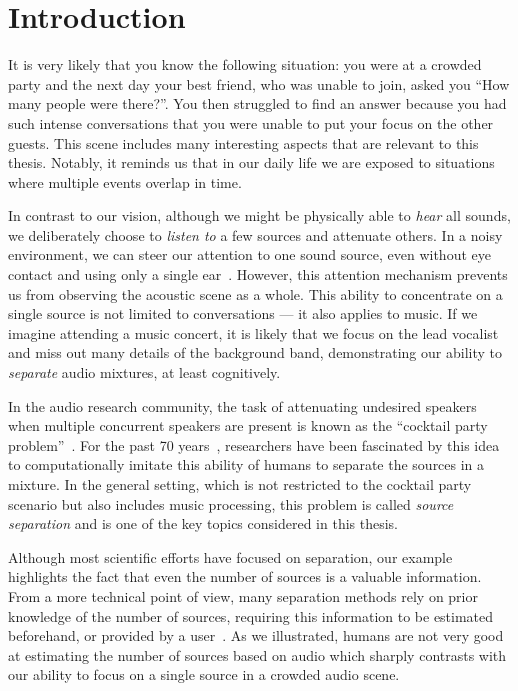 \chapter{Introduction}\label{ch:introduction}

It is very likely that you know the following situation: you were at a crowded party and the next day your best friend, who was unable to join, asked you ``How many people were there?''.
You then struggled to find an answer because you had such intense conversations that you were unable to put your focus on the other guests.
This scene includes many interesting aspects that are relevant to this thesis. Notably, it reminds us that in our daily life we are exposed to situations where multiple events overlap in time.
\par
In contrast to our vision, although we might be physically able to \emph{hear} all sounds, we deliberately choose to \emph{listen to} a few sources and attenuate others.
In a noisy environment, we can steer our attention to one sound source, even without eye contact and using only a single ear~\cite{bregman90}.
However, this attention mechanism prevents us from observing the acoustic scene as a whole.
This ability to concentrate on a single source is not limited to conversations --- it also applies to music.
If we imagine attending a music concert, it is likely that we focus on the lead vocalist and miss out many details of the background band, demonstrating our ability to \emph{separate} audio mixtures, at least cognitively.
\par
In the audio research community, the task of attenuating undesired speakers when multiple concurrent speakers are present is known as the ``cocktail party problem''~\cite{haykin05}.
For the past 70 years~\cite{cherry53}, researchers have been fascinated by this idea to computationally imitate this ability of humans to separate the sources in a mixture.
In the general setting, which is not restricted to the cocktail party scenario but also includes music processing, this problem is called \emph{source separation} and is one of the key topics considered in this thesis.
\par
Although most scientific efforts have focused on separation, our example highlights the fact that even the number of sources is a valuable information.
From a more technical point of view, many separation methods rely on prior knowledge of the number of sources, requiring this information to be estimated beforehand, or provided by a user~\cite{liutkus13}.
As we illustrated, humans are not very good at estimating the number of sources based on audio which sharply contrasts with our ability to focus on a single source in a crowded audio scene.
